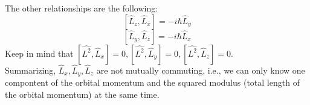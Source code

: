 \noindent
The other relationships are the following:
$$\left[\hat{L}_{z}, \hat{L}_{x}\right]=-i \hbar \hat{L}_{y}$$
$$\left[\hat{L}_{y}, \hat{L}_{z}\right]=-i \hbar \hat{L}_{x}$$
Keep in mind that $[\hat{L^2}, \hat{L}_{x}]=0,[\hat{L^2}, \hat{L}_{y}]=0,[\hat{L^2}, \hat{L}_{z}]=0$.\\
\noindent
Summarizing,  $\hat{L}_{x},\hat{L}_{y},\hat{L}_{z}$ are not mutually commuting, i.e., we can only know one compontent of the orbital momentum and the squared modulus (total length of the orbital momentum) at the same time.
